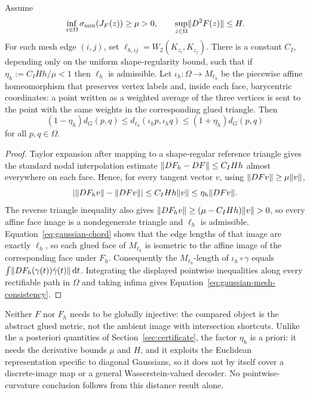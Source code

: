 \begin{proposition}
\label{prop:gaussian-mesh-consistency}
Assume
\begin{equation}
 \inf_{z\in\Omega}\sigma_{\min}(J_F(z))\ge\mu>0,
 \qquad
 \sup_{z\in\Omega}\lVert D^2F(z)\rVert\le H.
 \label{eq:gaussian-consistency-assumptions}
\end{equation}
For each mesh edge $(i,j)$, set $\ell_{h,ij}=W_2(K_{z_i},K_{z_j})$.  There is
a constant $C_I$, depending only on the uniform shape-regularity bound, such
that if $\eta_h:=C_IHh/\mu<1$ then $\ell_h$ is admissible.  Let
$\iota_h:\Omega\to M_{\ell_h}$ be the piecewise affine homeomorphism that
preserves vertex labels and, inside each face, barycentric coordinates: a
point written as a weighted average of the three vertices is sent to the point
with the same weights in the corresponding glued triangle.  Then
\begin{equation}
 (1-\eta_h)d_G(p,q)
 \le d_{\ell_h}(\iota_hp,\iota_hq)
 \le(1+\eta_h)d_G(p,q)
 \label{eq:gaussian-mesh-consistency}
\end{equation}
for all $p,q\in\Omega$.
\end{proposition}

\begin{proof}
Taylor expansion after mapping to a shape-regular reference triangle gives the
standard nodal interpolation estimate \cite{ciarlet1978}
$\lVert D F_h-D F\rVert\le C_IHh$ almost everywhere on each face.  Hence, for every
tangent vector $v$, using $\lVert DFv\rVert\ge\mu\lVert v\rVert$,
\begin{equation}
 \lvert \lVert D F_hv\rVert-\lVert D Fv\rVert\rvert
 \le C_IHh\lVert v\rVert
 \le\eta_h\lVert D Fv\rVert.
\end{equation}
The reverse triangle inequality also gives
$\lVert D F_hv\rVert\ge(\mu-C_IHh)\lVert v\rVert>0$, so every affine face image is a
nondegenerate triangle and $\ell_h$ is admissible.
Equation~\eqref{eq:gaussian-chord} shows that the edge lengths of that image
are exactly $\ell_h$, so each glued face of $M_{\ell_h}$ is isometric to the
affine image of the corresponding face under $F_h$.  Consequently the
$M_{\ell_h}$-length of $\iota_h\circ\gamma$ equals
$\int\lVert D F_h(\gamma(t))\dot\gamma(t)\rVert\,\mathrm{d} t$.  Integrating the displayed
pointwise inequalities along every rectifiable path in $\Omega$ and taking
infima gives Equation~\eqref{eq:gaussian-mesh-consistency}.
\end{proof}

Neither $F$ nor $F_h$ needs to be globally injective: the compared object is
the abstract glued metric, not the ambient image with intersection shortcuts.
Unlike the a posteriori quantities of Section~\ref{sec:certificate}, the
factor $\eta_h$ is a priori: it needs the derivative bounds $\mu$ and $H$, and
it exploits the Euclidean representation specific to diagonal Gaussians, so it
does not by itself cover a discrete-image map or a general
Wasserstein-valued decoder.  No pointwise-curvature conclusion follows from
this distance result alone.

